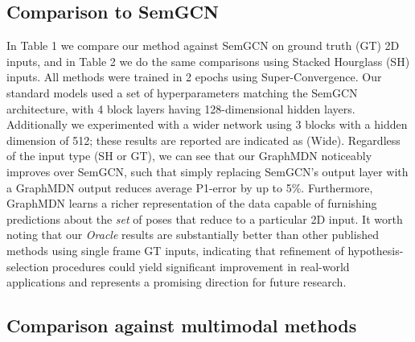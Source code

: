 \subsection{Comparison to SemGCN}

In Table 1 we compare our method against SemGCN \cite{Zhao_2019_CVPR} on ground truth (GT) 2D inputs, and in Table 2 we do the same comparisons using Stacked Hourglass (SH) inputs. All methods were trained in 2 epochs using Super-Convergence. Our standard models used a set of hyperparameters matching the SemGCN architecture, with 4 block layers having 128-dimensional hidden layers. Additionally we experimented with a wider network using 3 blocks with a hidden dimension of 512; these results are reported are indicated as (Wide). Regardless of the input type (SH or GT), we can see that our GraphMDN noticeably improves over SemGCN, such that simply replacing SemGCN's output layer with a GraphMDN output reduces average P1-error by up to 5\%. Furthermore, GraphMDN learns a richer representation of the data capable of furnishing predictions about the \textit{set} of poses that reduce to a particular 2D input. It worth noting that our \textit{Oracle} results are substantially better than other published methods using single frame GT inputs, indicating that refinement of hypothesis-selection procedures could yield significant improvement in real-world applications and represents a promising direction for future research.

\subsection{Comparison against multimodal methods}

